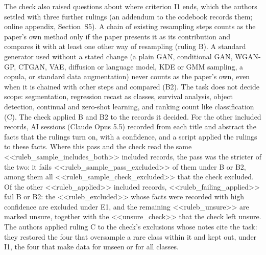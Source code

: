 The check also raised questions about where criterion I1 ends, which the authors settled with three further rulings (an addendum to the codebook records them; online appendix, Section~S5). A chain of existing resampling steps counts as the paper's own method only if the paper presents it as its contribution and compares it with at least one other way of resampling (ruling B). A standard generator used without a stated change (a plain GAN, conditional GAN, WGAN-GP, CTGAN, VAE, diffusion or language model, KDE or GMM sampling, a copula, or standard data augmentation) never counts as the paper's own, even when it is chained with other steps and compared (B2). The task does not decide scope: segmentation, regression recast as classes, survival analysis, object detection, continual and zero-shot learning, and ranking count like classification (C). The check applied B and B2 to the records it decided. For the other included records, AI sessions (Claude Opus 5.5) recorded from each title and abstract the facts that the rulings turn on, with a confidence, and a script applied the rulings to these facts. Where this pass and the check read the same <<ruleb_sample_includes_both>> included records, the pass was the stricter of the two: it fails <<ruleb_sample_pass_excluded>> of them under B or B2, among them all <<ruleb_sample_check_excluded>> that the check excluded. Of the other <<ruleb_applied>> included records, <<ruleb_failing_applied>> fail B or B2: the <<ruleb_excluded>> whose facts were recorded with high confidence are excluded under E1, and the remaining <<ruleb_unsure>> are marked unsure, together with the <<unsure_check>> that the check left unsure. The authors applied ruling C to the check's exclusions whose notes cite the task: they restored the four that oversample a rare class within it and kept out, under I1, the four that make data for unseen or for all classes.
